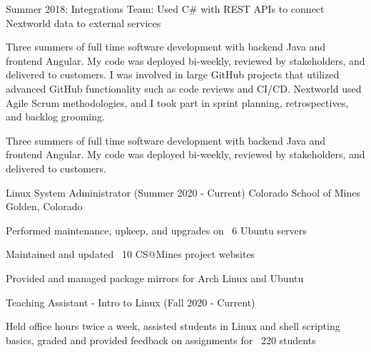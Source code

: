 \begin{cventries}
{\begin{cvitems}
    \item {Summer 2018: Integrations Team: Used C\# with REST APIs to connect Nextworld data to external services }
    \fi
      \end{cvitems}
    }
    {
      \ifcv
      \begin{cventrysummary}
        Three summers of full time software development with backend Java and frontend Angular. 
        My code was deployed bi-weekly, reviewed by stakeholders, and delivered to customers.
        I was involved in large GitHub projects that utilized advanced GitHub functionality such as code reviews and CI/CD.
        Nextworld used Agile Scrum methodologies, and I took part in sprint planning, retrospectives, and backlog grooming.
      \end{cventrysummary}
      \else
      \begin{cventrysummary}
        Three summers of full time software development with backend Java and frontend Angular.
        My code was deployed bi-weekly, reviewed by stakeholders, and delivered to customers.
      \end{cventrysummary}
      \fi
    }

    \cventry
    {Linux System Administrator (Summer 2020 - Current)}
    {Colorado School of Mines}
    {Golden, Colorado}
    {}
    {
        \begin{cvitems}
        \item Performed maintenance, upkeep, and upgrades on ~6 Ubuntu servers
        \item Maintained and updated ~10 CS@Mines project websites
        \item Provided and managed package mirrors for Arch Linux and Ubuntu
        \end{cvitems}
    }
    {}

    \vspace{-1.0mm}
    \cventry
    {Teaching Assistant - Intro to Linux (Fall 2020 - Current)}
    {}
    {}
    {}
    {
        \begin{cvitems}
        \item Held office hours twice a week, assisted students in Linux and shell scripting basics, graded and provided feedback on assignments for ~220 students
        \end{cvitems}
    }
    {}



\end{cventries}
